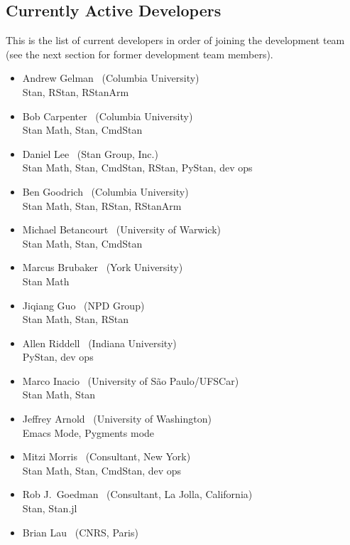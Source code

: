 \subsection*{Currently Active Developers}

This is the list of current developers in order of joining the
development team (see the next section for former development team
members).

\begin{itemize}
\item Andrew Gelman \ (Columbia University)
\\ {\footnotesize Stan, RStan, RStanArm}
\item Bob Carpenter \ (Columbia University) \\ {\footnotesize Stan
    Math, Stan, CmdStan}
\item Daniel Lee \   (Stan Group, Inc.)
\\ {\footnotesize Stan Math, Stan, CmdStan, RStan, PyStan, dev ops}
\item Ben Goodrich \   (Columbia University)
\\ {\footnotesize Stan Math, Stan, RStan, RStanArm}
\item Michael Betancourt \ (University of Warwick) \\
  {\footnotesize Stan Math, Stan, CmdStan}
\item Marcus Brubaker \   (York University)
\\ {\footnotesize Stan Math}
\item Jiqiang Guo \   (NPD Group)
\\ {\footnotesize Stan Math, Stan, RStan}
\item Allen Riddell \   (Indiana University)
\\ {\footnotesize PyStan, dev ops}
\item Marco Inacio \   (University of S\~{a}o Paulo/UFSCar)
\\ {\footnotesize Stan Math, Stan}
\item Jeffrey Arnold \   (University of Washington)
\\ {\footnotesize Emacs Mode, Pygments mode}
\item Mitzi Morris \   (Consultant, New York)
\\ {\footnotesize Stan Math, Stan, CmdStan, dev ops}
\item Rob J.\ Goedman \ (Consultant, La Jolla, California)
\\ {\footnotesize Stan, Stan.jl}
\item Brian Lau \ (CNRS, Paris)

\end{itemize}
